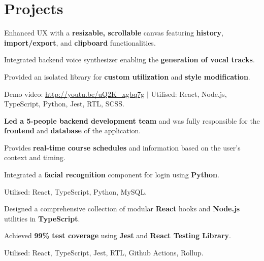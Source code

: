 \documentclass[a4paper,10pt]{article}
\begin{document}
\section{Projects}

\begin{tightitemize}
  \item Enhanced UX with a \textbf{resizable, scrollable} canvas featuring \textbf{history}, \textbf{import/export}, and \textbf{clipboard} functionalities.
  \item Integrated backend voice synthesizer enabling the \textbf{generation of vocal tracks}.
  \item Provided an isolated library for \textbf{custom utilization} and \textbf{style modification}.
  \item Demo video: \href{http://youtu.be/uQ2K\_xgbq7g}{\underline{http://youtu.be/uQ2K\_xgbq7g}} $|$ Utilised: React, Node.js, TypeScript, Python, Jest, RTL, SCSS.
\end{tightitemize}

\begin{tightitemize}
  \item \textbf{Led a 5-people backend development team} and was fully responsible for the \textbf{frontend} and \textbf{database} of the application.
  \item Provides \textbf{real-time course schedules} and information based on the user's context and timing.
  \item Integrated a \textbf{facial recognition} component for login using \textbf{Python}.
  \item Utilised: React, TypeScript, Python, MySQL.
\end{tightitemize}

\begin{tightitemize}
  \item Designed a comprehensive collection of modular \textbf{React} hooks and \textbf{Node.js} utilities in \textbf{TypeScript}.
  \item Achieved \textbf{99\% test coverage} using \textbf{Jest} and \textbf{React Testing Library}.
  \item Utilised: React, TypeScript, Jest, RTL, Github Actions, Rollup.
\end{tightitemize}
\end{document}
